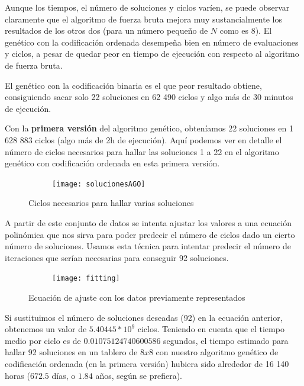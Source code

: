 \documentclass[12pt]{article}
\begin{document}
Aunque los tiempos, el número de soluciones y ciclos varíen, se puede observar claramente que el algoritmo de fuerza bruta mejora muy sustancialmente los resultados de los otros dos (para un número pequeño de $N$ como es 8). El genético con la codificación ordenada desempeña bien en número de evaluaciones y ciclos, a pesar de quedar peor en tiempo de ejecución con respecto al algoritmo de fuerza bruta.

El genético con la codificación binaria es el que peor resultado obtiene, consiguiendo sacar solo 22 soluciones en 62 490 ciclos y algo más de 30 minutos de ejecución.

Con la \textbf{primera versión} del algoritmo genético, obteníamos 22 soluciones en 1 628 883 ciclos (algo más de 2h de ejecución). Aquí podemos ver en detalle el número de ciclos necesarios para hallar las soluciones 1 a 22 en el algoritmo genético con codificación ordenada en esta primera versión.

\clearpage\newpage
\begin{figure}[h]
    \center
    \begin{subfigure}{.50\textwidth}
        \texttt{[image: solucionesAGO]}
    \end{subfigure}
    \caption{Ciclos necesarios para hallar varias soluciones}
\end{figure}

A partir de este conjunto de datos se intenta ajustar los valores a una ecuación polinómica que nos sirva para poder predecir el número de ciclos dado un cierto número de soluciones. Usamos esta técnica para intentar predecir el número de iteraciones que serían necesarias para conseguir 92 soluciones.

\begin{figure}[h]
    \center
    \begin{subfigure}{.90\textwidth}
        \texttt{[image: fitting]}
    \end{subfigure}
    \caption{Ecuación de ajuste con los datos previamente representados}
\end{figure}

Si sustituimos el número de soluciones deseadas (92) en la ecuación anterior, obtenemos un valor de $5.40445*10^9$ ciclos. Teniendo en cuenta que el tiempo medio por ciclo es de $0.01075124740600586$ segundos, el tiempo estimado para hallar 92 soluciones en un tablero de $8x8$ con nuestro algoritmo genético de codificación ordenada (en la primera versión) hubiera sido alrededor de 16 140 horas ($672.5$ días, o $1.84$ años, según se prefiera).
\end{document}
